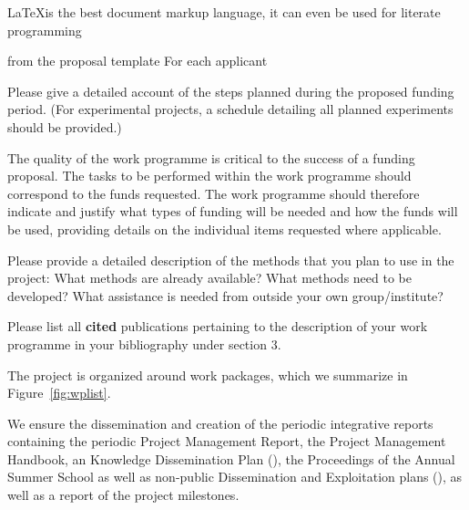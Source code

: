 \LaTeX is the best document markup language, it can even be used for literate
programming~\cite{DK:LP,Lamport:ladps94,Knuth:ttb84}


\begin{todo}{from the proposal template}
For each applicant

Please give a detailed account of the steps planned during the proposed funding period. (For experimental projects, a schedule detailing all planned experiments should
be provided.)

The quality of the work programme is critical to the success of a funding proposal. The tasks to be performed within the
work programme should correspond to the funds requested. The work programme should therefore indicate and justify what types of funding will be needed and how the funds will be used, providing details on the individual items requested where applicable.

Please provide a detailed description of the methods that you plan to use in the project:
What methods are already available? What methods need to be developed? What assistance is needed from outside your own group/institute?

Please list all \textbf{cited} publications pertaining to the description of your work programme
in your bibliography under section 3.
\end{todo}

The project is organized around  work packages, which we summarize in
Figure~\ref{fig:wplist}. 
 
\wpfig

We ensure the dissemination and creation of the periodic integrative reports containing
the periodic Project Management Report, the Project Management Handbook, an Knowledge
Dissemination Plan ({}), the Proceedings of the Annual {\pn} Summer
School as well as non-public Dissemination and Exploitation plans ({}), as
well as a report of the {\pn} project milestones.

